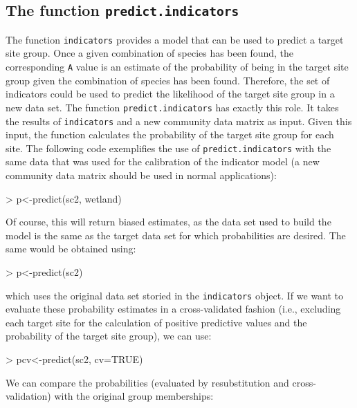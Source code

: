 \documentclass[11pt,a4paper]{article}
\begin{document}
\subsection{The function \texttt{predict.indicators}}
The function \texttt{indicators} provides a model that can be used to predict a target site group. Once a given combination of species has been found, the corresponding \texttt{A} value is an estimate of the probability of being in the target site group given the combination of species has been found. Therefore, the set of indicators could be used to predict the likelihood of the target site group in a new data set. The function \texttt{predict.indicators} has exactly this role. It takes the results of \texttt{indicators} and a new community data matrix as input. Given this input, the function calculates the probability of the target site group for each site. The following code exemplifies the use of \texttt{predict.indicators} with the same data that was used for the calibration of the indicator model (a new community data matrix should be used in normal applications):
\begin{Schunk}
\begin{Sinput}
> p<-predict(sc2, wetland)
\end{Sinput}
\end{Schunk}
Of course, this will return biased estimates, as the data set used to build the model is the same as the target data set for which probabilities are desired. The same would be obtained using:
\begin{Schunk}
\begin{Sinput}
> p<-predict(sc2)
\end{Sinput}
\end{Schunk}
which uses the original data set storied in the \texttt{indicators} object. If we want to evaluate these probability estimates in a cross-validated fashion (i.e., excluding each target site for the calculation of positive predictive values and the probability of the target site group), we can use:
\begin{Schunk}
\begin{Sinput}
> pcv<-predict(sc2, cv=TRUE)
\end{Sinput}
\end{Schunk}
We can compare the probabilities (evaluated by resubstitution and cross-validation) with the original group memberships:
\end{document}
